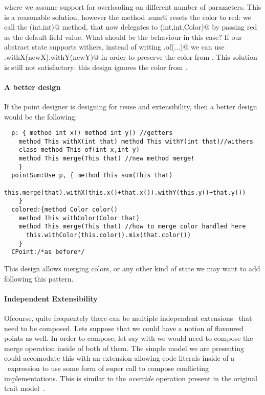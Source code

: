 \noindent 
where we assume support for overloading on different number of parameters.
This is a reasonable solution, however the method \Q@CPoint.sum@ resets
the color to red: we call the \Q@of(int,int)@ method, that now
delegates to \Q@of(int,int,Color)@ by passing red as the default field
value.  What should be the behaviour in this case?  If our abstract
state supports withers, instead of writing \Q@This.of(...)@ we can use
\Q@this.withX(newX).withY(newY)@ in order to preserve the color from
\Q@this@.  This solution is still not satisfactory: this design ignores
the color from \Q@that@.

\paragraph{A better design}
If the point designer is designing for reuse and extensibility, then 
a better design would be the following:  
\begin{lstlisting}
  p: { method int x() method int y() //getters
    method This withX(int that) method This withY(int that)//withers
    class method This of(int x,int y)
    method This merge(This that) //new method merge!
    }
  pointSum:Use p, { method This sum(This that)
      this.merge(that).withX(this.x()+that.x()).withY(this.y()+that.y())
    }
  colored:{method Color color()
    method This withColor(Color that)
    method This merge(This that) //how to merge color handled here
      this.withColor(this.color().mix(that.color())
    }
  CPoint:/*as before*/
\end{lstlisting}  
  This design allows merging colors, or any other kind of state we may want to add
  following this pattern.

\paragraph{Independent Extensibility}
  Ofcourse, quite frequentely there can be multiple independent
  extensions~\cite{Zenger-Odersky2005} that need to be composed. Lets suppose that 
  we could have a notion of flavoured points as well.   
  In order to compose, let say \Q@colored@ with \Q@flavored@ we would
  need to compose the merge operation inside of both of them.
  The simple model we are presenting could accomodate this with an
  extension allowing code literals inside of a \use\ expression to use some form of super call to compose conflicting implementations. This is similar to the \emph{override} operation present in the original trait model~\cite{ducasse2006traits}.

